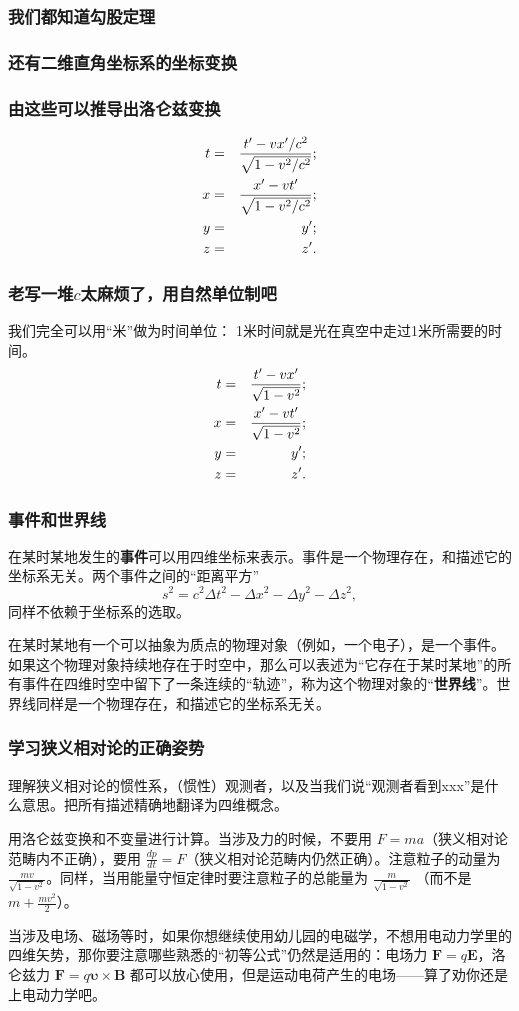 \documentclass[CJK,13pt]{beamer}
\date{}
\begin{document}
  \bch
{}


\begin{frame}
  \frametitle{我们都知道勾股定理}
\end{frame}


\begin{frame}
  \frametitle{还有二维直角坐标系的坐标变换}
\end{frame}


\begin{frame}
  \frametitle{由这些可以推导出洛仑兹变换}
  \begin{eqnarray}
  t&=&\frac{t'-vx'/c^2}{\sqrt{1-v^2/c^2}}; \nonumber \\
  x&=&\frac{x'-vt'}{\sqrt{1-v^2/c^2}}; \nonumber \\
  y&=&y'; \nonumber \\
  z&=&z'. \nonumber
  \end{eqnarray}
\end{frame}


\begin{frame}
  \frametitle{老写一堆$c$太麻烦了，用自然单位制吧}
  我们完全可以用``米''做为时间单位： 1米时间就是光在真空中走过1米所需要的时间。
  \begin{eqnarray}
  t&=&\frac{t'-vx'}{\sqrt{1-v^2}}; \nonumber \\
  x&=&\frac{x'-vt'}{\sqrt{1-v^2}}; \nonumber \\
  y&=&y'; \nonumber \\
  z&=&z'. \nonumber
  \end{eqnarray}
\end{frame}

\begin{frame}
  \frametitle{事件和世界线}
  \bitem
  \item{在某时某地发生的{\bf 事件}可以用四维坐标来表示。事件是一个物理存在，和描述它的坐标系无关。两个事件之间的``距离平方'' $$s^2= c^2\Delta t^2 - \Delta x^2 -\Delta y^2-\Delta z^2,$$同样不依赖于坐标系的选取。}
  \item{在某时某地有一个可以抽象为质点的物理对象（例如，一个电子），是一个事件。如果这个物理对象持续地存在于时空中，那么可以表述为``它存在于某时某地''的所有事件在四维时空中留下了一条连续的“轨迹”，称为这个物理对象的“{\bf 世界线}”。世界线同样是一个物理存在，和描述它的坐标系无关。}
    \eitem
\end{frame}




\begin{frame}
  \frametitle{学习狭义相对论的正确姿势}
  \bitem
\item{理解狭义相对论的惯性系，（惯性）观测者，以及当我们说“观测者看到xxx”是什么意思。把所有描述精确地翻译为四维概念。}
\item{用洛仑兹变换和不变量进行计算。当涉及力的时候，不要用  $F=ma$（狭义相对论范畴内不正确），要用 $\frac{dp}{dt} = F$（狭义相对论范畴内仍然正确）。注意粒子的动量为
  $\frac{mv}{\sqrt{1-v^2}}$。同样，当用能量守恒定律时要注意粒子的总能量为 $\frac{m}{\sqrt{1-v^2}}$ （而不是 $m+\frac{mv^2}{2}$）。}
\item{当涉及电场、磁场等时，如果你想继续使用幼儿园的电磁学，不想用电动力学里的四维矢势，那你要注意哪些熟悉的“初等公式”仍然是适用的：电场力 $\mathbf{F}=q\mathbf{E}$，洛仑兹力
$\mathbf{F} = q\mathbf{\upsilon}\times \mathbf{B}$ 都可以放心使用，但是运动电荷产生的电场——算了劝你还是上电动力学吧。}
  \eitem

\end{frame}
\end{document}
